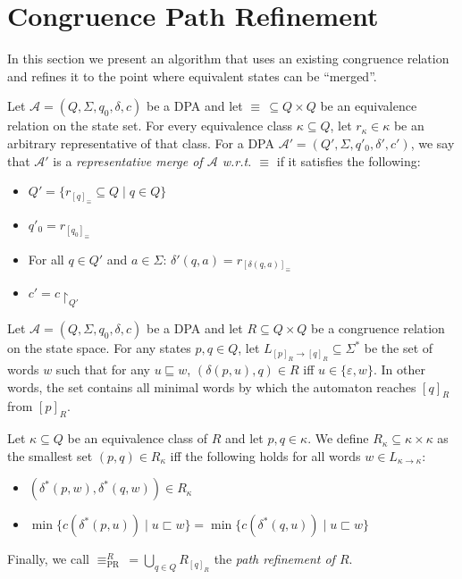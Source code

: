 
\section{Congruence Path Refinement}

In this section we present an algorithm that uses an existing congruence relation and refines it to the point where equivalent states can be \enquote{merged}.

\begin{defn}
	Let $\mathcal{A} = (Q, \Sigma, q_0, \delta, c)$ be a DPA and let $\equiv \,\subseteq Q \times Q$ be an equivalence relation on the state set. For every equivalence class $\kappa \subseteq Q$, let $r_\kappa \in \kappa$ be an arbitrary representative of that class. For a DPA $\mathcal{A}' = (Q', \Sigma, q'_0, \delta', c')$, we say that $\mathcal{A}'$ is a \emph{representative merge of $\mathcal{A}$ w.r.t. $\equiv$} if it satisfies the following:
	\begin{itemize}
		\item $Q' = \{ r_{[q]_\equiv} \subseteq Q \mid q \in Q \}$
		\item $q'_0 = r_{[q_0]_\equiv}$
		\item For all $q \in Q'$ and $a \in \Sigma$: $\delta'(q, a) = r_{[\delta(q, a)]_\equiv}$
		\item $c' = c\upharpoonright_{Q'}$
	\end{itemize}
\end{defn}

\begin{defn}
	Let $\mathcal{A} = (Q, \Sigma, q_0, \delta, c)$ be a DPA and let $R \subseteq Q \times Q$ be a congruence relation on the state space. For any states $p, q \in Q$, let $L_{[p]_R \rightarrow [q]_R} \subseteq \Sigma^*$ be the set of words $w$ such that for any $u \sqsubseteq w$, $(\delta(p, u), q) \in R$ iff $u \in \{\varepsilon, w\}$. In other words, the set contains all minimal words by which the automaton reaches $[q]_R$ from $[p]_R$.
	
	Let $\kappa \subseteq Q$ be an equivalence class of $R$ and let $p, q \in \kappa$. We define $R_\kappa \subseteq \kappa \times \kappa$ as the smallest set $(p, q) \in R_\kappa$ iff the following holds for all words $w \in L_{\kappa \rightarrow \kappa}$:
	\begin{itemize}
		\item $(\delta^*(p, w), \delta^*(q, w)) \in R_\kappa$
		\item $\min \{ c(\delta^*(p, u)) \mid u \sqsubset w \} = \min \{ c(\delta^*(q, u)) \mid u \sqsubset w \}$
	\end{itemize}
	
	Finally, we call $\equiv_\text{PR}^R \,= \bigcup_{q \in Q} R_{[q]_R}$ the \emph{path refinement of $R$}.
\end{defn}

